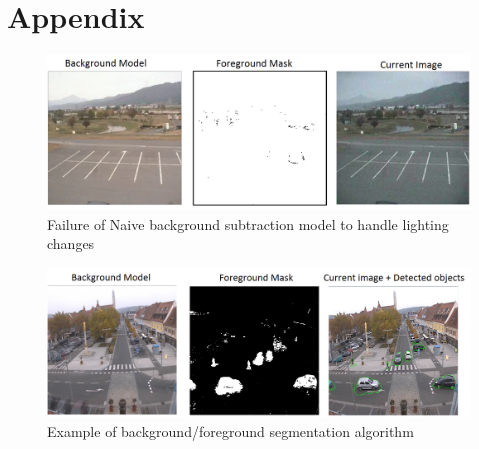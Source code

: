 \documentclass{article}
\begin{document}
\section{Appendix}
\begin{figure}[h]
\centering
\includegraphics[scale = 0.4]{LightingConditions}
\caption{Failure of Naive background subtraction model to handle lighting changes}
\label{Fig:LightingConditions}
\end{figure}
\begin{figure}[h]
\centering
\includegraphics[scale = 0.4]{BackgroundSubtraction1}
\caption{Example of background/foreground segmentation algorithm}
\label{Fig:ForegroundDetection}
\end{figure}
\end{document}
